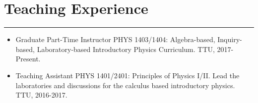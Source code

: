 \documentclass[letterpaper,10pt]{article}
\begin{document}
\section*{Teaching Experience}

\hrule
\vspace{.3 cm}


\begin{itemize}[label=$\blacktriangleright$]
\item   Graduate Part-Time Instructor PHYS 1403/1404: Algebra-based, Inquiry-based, Laboratory-based Introductory Physics Curriculum. TTU, 2017-Present.  
 
 \item   Teaching Assistant  PHYS 1401/2401: Principles of Physics I/II. Lead the laboratories and discussions for the calculus based introductory physics. TTU, 2016-2017.
  

  \end{itemize}
  
  \begin{comment}
  
\begin{itemize}[label=$\blacktriangleright$]

	\item \emph{Graduate Part-Time Instructor} PHYS 1403/1404: Algebra-based, Inquiry-based, Laboratory-based Introductory Physics Curriculum. TTU, 2017-Present.  
	
	

	
\item \emph{Teaching Assistant.}  PHYS 1401/2401: Principles of Physics I/II. Lead the laboratories and discussions for the calculus based introductory physics. TTU, 2016-2017.  
  	  

  \item \emph{Undergraduate Teaching Fellow.}  PHYS 2215: Physics for Scientists and Engineers Lab I -  Utah State, Fall 2013.
  \end{itemize}


\end{comment}
\end{document}
